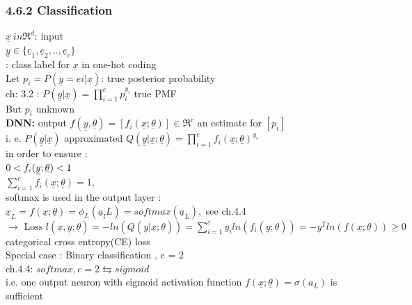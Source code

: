 \subsubsection{4.6.2 Classification}
$ \underline{x} \ in \Re^d  $: input \\
$ \underline{y} \in \lbrace \underline{e}_1 , \underline{e}_2,..,\underline{e}_c \rbrace $ \\: class label for $ \underline{x} $ in one-hot coding \\
Let $ p_i = P(\underline{y} = \underline{e}i | \underline{x} )  $: true posterior probability \\
ch: 3.2 : $ P(\underline{y} | \underline{x}) = \prod_{i=1}^{c}  p_i ^{y_i}$ true PMF \\
But $ p_i $ unknown \\
\textbf{DNN: }
\textbullet output $ f(\underline{y} ,\underline{\theta}) = [f_i (\underline{x}; \underline{\theta})] \in \Re^c $ an estimate for $  [p_i]  $ \\
\textbullet i. e. $ P(\underline{y} | \underline{x}) $ approximated $ Q (\underline{y} | \underline{x} ; \underline{\theta})  = \prod_{ i=1 }^{c} f_i ( \underline{x} ; \underline{\theta})^{y_i}$\\
in order to ensure : \\
\textbullet $  0 < f_i (\underline{y} ; \underline{\theta}) < 1 \\ $\\
\textbullet $  \sum_{i=1}^{c} f_i (\underline{x} ; \underline{\theta})  = 1,$ \\
softmax is used in the output layer : \\
$  \underline{x} _{L} = f (\underline{x} ; \underline{\theta}) = \phi_L (\underline{a}_lL) = softmax (\underline{a}_L) , $ see ch.4.4\\
$  \rightarrow \text{ Loss } l(\underline{x} , \underline{y} ; \underline{\theta}) = - ln(Q(\underline{y} | \underline{x} ; \underline{\theta })) = \sum_{i=1  }^{c} y_i ln (f_i (\underline{y} ; \underline{\theta}))   = - \underline{y} ^T ln (f(\underline{x} ; \underline{ \theta })) \geq 0 $\\
categorical cross entropy(CE) loss \\
Special case : Binary classification , c = 2 \\
ch.4.4: $ softmax , c = 2 \leftrightarrows sigmoid $ \\
i.e. one output neuron with sigmoid activation function $ f(\underline{x}; \underline{ \theta})  = \sigma (a_L)$ is sufficient\\
